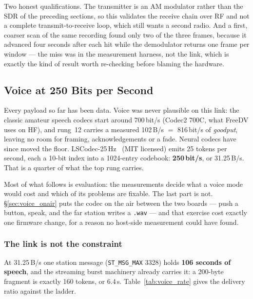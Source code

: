 Two honest qualifications.  The transmitter is an AM modulator rather
than the SDR of the preceding sections, so this validates the receive
chain over RF and not a complete transmit-to-receive loop, which still
wants a second radio.  And a first, coarser scan of the same recording
found only two of the three frames, because it advanced four seconds
after each hit while the demodulator returns one frame per window ---
the miss was in the measurement harness, not the link, which is exactly
the kind of result worth re-checking before blaming the hardware.

\subsection{Voice at 250 Bits per Second}
\label{sec:cport_voice}

Every payload so far has been data.  Voice was never plausible on this
link: the classic amateur speech codecs start around 700\,bit/s
(Codec2 700C, what FreeDV uses on HF), and rung~12 carries a measured
102\,B/s $=$ 816\,bit/s of \emph{goodput}, leaving no room for framing,
acknowledgements or a fade.  Neural codecs have since moved the floor.
LSCodec-25\,Hz~\cite{guo2025lscodec} (MIT licensed)
emits 25 tokens per second, each a 10-bit index into a 1024-entry
codebook: \textbf{250\,bit/s}, or 31.25\,B/s.  That is a quarter of
what the top rung carries.

Most of what follows is evaluation: the measurements decide what a
voice mode would cost and which of its problems are fixable.  The last
part is not.  \S\ref{sec:voice_onair} puts the codec on the air
between the two boards --- push a button, speak, and the far station
writes a \texttt{.wav} --- and that exercise cost exactly one firmware
change, for a reason no host-side measurement could have found.

\subsubsection{The link is not the constraint}

At 31.25\,B/s one station message (\texttt{ST\_MSG\_MAX} 3328) holds
\textbf{106 seconds of speech}, and the streaming burst machinery
already carries it: a 200-byte fragment is exactly 160 tokens, or
6.4\,s.  Table~\ref{tab:voice_rate} gives the delivery ratio against
the ladder.

